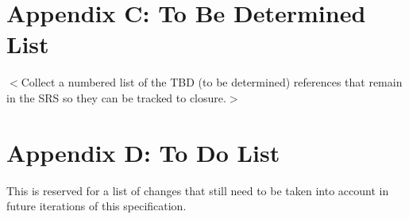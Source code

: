 \documentclass{scrreprt}
\begin{document}
\section{Appendix C: To Be Determined List}
$<$Collect a numbered list of the TBD (to be determined) references that remain
in the SRS so they can be tracked to closure.$>$

\section{Appendix D: To Do List}
This is reserved for a list of changes that still need to be taken into account in
future iterations of this specification.
\end{document}
